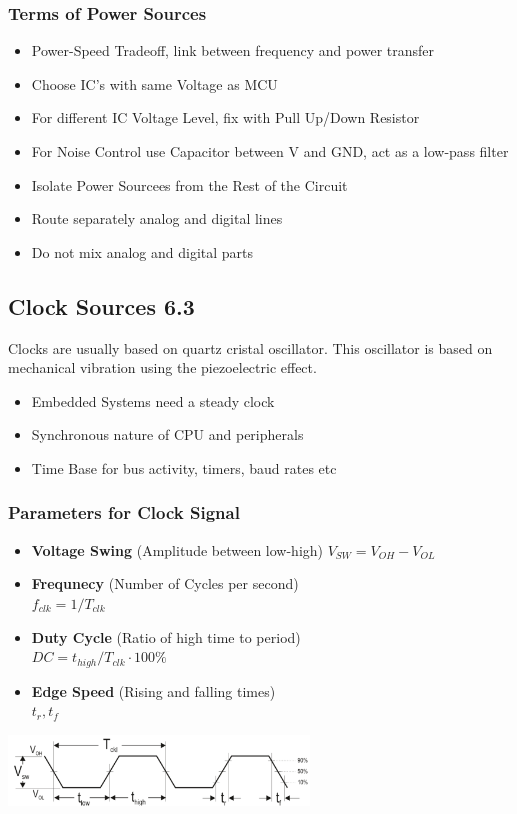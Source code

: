 \subsubsection{Terms of Power Sources}
	\begin{itemize}
		\item Power-Speed Tradeoff, link between frequency and power transfer
		\item Choose IC's with same Voltage as MCU
		\item For different IC Voltage Level, fix with Pull Up/Down Resistor
		\item For Noise Control use Capacitor between V and GND, act as a low-pass filter
		\item Isolate Power Sourcees from the Rest of the Circuit
		\item Route separately analog and digital lines 
		\item Do not mix analog and digital parts
	\end{itemize}
\pagebreak
\clearpage
\subsection{Clock Sources 6.3 }
Clocks are usually based on quartz cristal oscillator. This oscillator is based on mechanical vibration using the piezoelectric effect. 
\begin{itemize}
	\item Embedded Systems need a steady clock
	\item Synchronous nature of CPU and peripherals
	\item Time Base for bus activity, timers, baud rates etc
\end{itemize}
\subsubsection{Parameters for Clock Signal}
\begin{minipage}{9cm}
	\begin{itemize}
		\item \textbf{Voltage Swing} (Amplitude between low-high) $V_{SW}=V_{OH}-V_{OL}$
		\item \textbf{Frequnecy} (Number of Cycles per second) \\$f_{clk}=1/T_{clk}$
		\item \textbf{Duty Cycle} (Ratio of high time to period)\\ $DC=t_{high}/T_{clk} \cdot 100 \%$
		\item \textbf{Edge Speed} (Rising and falling times)\\$t_r, t_f$
	\end{itemize}
\end{minipage}
\begin{minipage}{8cm}
	\includegraphics[width=8cm]{images/clock_parameters.png}
\end{minipage}
